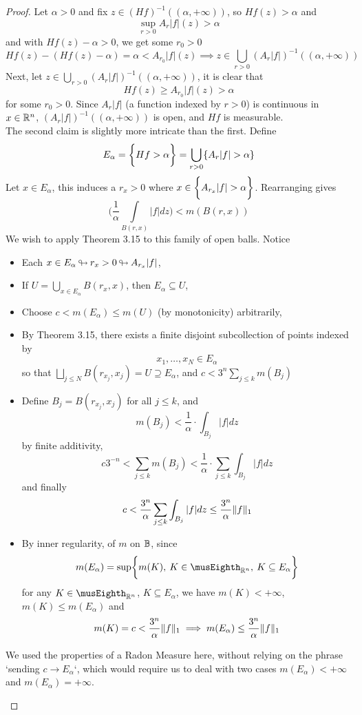 \documentclass[../../main.tex]{subfiles}
\begin{document}
\begin{proof}
    Let $\alpha>0$ and fix $z\in (Hf)^{-1}((\alpha,+\infty))$, so $Hf(z)>\alpha$ and 
    \[\sup_{r>0}A_r|f|(z)>\alpha\]
    and with $Hf(z)-\alpha>0$, we get some $r_0>0$ \[
    Hf(z)-(Hf(z)-\alpha)=\alpha < A_{r_0}|f|(z)\implies z\in \bigcup\limits_{r>0}(A_r|f|)^{-1}((\alpha,+\infty))
    \]
    Next, let $z\in\bigcup\limits_{r>0}(A_r|f|)^{-1}((\alpha,+\infty))$, it is clear that
    \[
    Hf(z)\geq A_{r_0}|f|(z)>\alpha
    \]
    for some $r_0>0$. Since $A_r|f|$ (a function indexed by $r>0$) is continuous in $x\in{\mathbb{R}^n}$, $(A_r|f|)^{-1}((\alpha,+\infty))$ is open, and $Hf$ is measurable.\\

    The second claim is slightly more intricate than the first. Define 
    \[
    E_\alpha = \bigset{Hf>\alpha}=\bigcup\limits_{r>0}\{A_r|f|>\alpha\}
    \]
    Let $x\in E_\alpha$, this induces a $r_x>0$ where $x\in\bigset{A_{r_x}|f|>\alpha}$. Rearranging gives
    \[
    \biggl(\dfrac{1}{\alpha}\int\limits_{B(r,x)}|f|dz\biggr)<m(B(r,x))
    \]
    We wish to apply Theorem 3.15 to this family of open balls. Notice
    \begin{itemize}
        \item Each $x\in E_\alpha{\:\looparrowright\:} r_x>0{\:\looparrowright\:} A_{r_x}|f|$,
        \item If $U = \bigcup\limits_{x\in E_\alpha} B(r_x,x)$, then $E_\alpha\subseteq U$,
        \item Choose $c<m(E_\alpha)\leq m(U)$ (by monotonicity) arbitrarily, 
        \item By Theorem 3.15, there exists a finite disjoint subcollection of points indexed by 
        \[
        x_1,\ldots,x_N \in E_\alpha
        \]
        so that $\bigsqcup_{j\leq N}B(r_{x_j},x_j)=U\supseteq E_\alpha$, and $c<3^n\sum_{j\leq k}m(B_j)$
        \item Define $B_j= B(r_{x_j}, x_j)$ for all $j\leq k$, and 
        \[
        m(B_j)< \dfrac{1}{\alpha}\cdot\int_{B_j}|f|dz
        \]
        by finite additivity,
        \[
        c3^{-n}<\sum_{j\leq k}m(B_j)<\dfrac{1}{\alpha}\cdot\sum_{j\leq k}\int_{B_j}|f|dz
        \]
        and finally
        \[
        c<\dfrac{3^n}{\alpha}\sum_{j\leq k}\int_{B_j}|f|dz\leq \dfrac{3^n}{\alpha}\lVert {f} \rVert_1
        \]
        \item By inner regularity, of $m$ on ${\mathbb{B}}$, since 
        \[
        m(E_\alpha) = \sup\bigset{m(K),\: K\in\cpt_{\realn}, \: K\subseteq E_\alpha}
        \]
        for any $K\in\cpt_{\realn}$, $K\subseteq E_\alpha$, we have $m(K)<+\infty$, $m(K)\leq m(E_\alpha)$ and 
        \[
        m(K)=c<\dfrac{3^n}{\alpha}\lVert {f} \rVert_1\implies m(E_\alpha)\leq \dfrac{3^n}{\alpha}\lVert {f} \rVert_1
        \]
    \end{itemize}
    \begin{remark}
        We used the properties of a Radon Measure here, without relying on the phrase `sending $c\to E_\alpha$`, which would require us to deal with two cases $m(E_\alpha)<+\infty$ and $m(E_\alpha)=+\infty$.
    \end{remark}
\end{proof}
\end{document}
